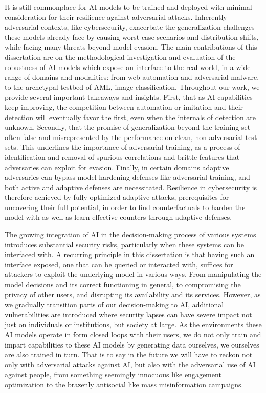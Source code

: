 It is still commonplace for \gls{AI} models to be trained and deployed with minimal consideration for their resilience against adversarial attacks.
Inherently adversarial contexts, like cybersecurity, exacerbate the generalization challenges these models already face by causing worst-case scenarios and distribution shifts, while facing many threats beyond model evasion.
The main contributions of this dissertation are on the methodological investigation and evaluation of the robustness of AI models which expose an interface to the real world, in a wide range of domains and modalities: from web automation and adversarial malware, to the archetypal testbed of \gls{AML}, image classification.
Throughout our work, we provide several important takeaways and insights.
First, that as \gls{AI} capabilities keep improving, the competition between automation or imitation and their detection will eventually favor the first, even when the internals of detection are unknown.
Secondly, that the promise of generalization beyond the training set often false and misrepresented by the performance on clean, non-adversarial test sets.
This underlines the importance of adversarial training, as a process of identification and removal of spurious correlations and brittle features that adversaries can exploit for evasion.
Finally, in certain domains adaptive adversaries can bypass model hardening defenses like adversarial training, and both active and adaptive defenses are necessitated.
Resilience in cybersecurity is therefore achieved by fully optimized adaptive attacks, prerequisites for uncovering their full potential, in order to find counterfactuals to harden the model with as well as learn effective counters through adaptive defenses.

The growing integration of \gls{AI} in the decision-making process of various systems introduces substantial security risks, particularly when these systems can be interfaced with.
A recurring principle in this dissertation is that having such an interface exposed, one that can be queried or interacted with, suffices for attackers to exploit the underlying model in various ways.
From manipulating the model decisions and its correct functioning in general, to compromising the privacy of other users, and disrupting its availability and its services.
However, as we gradually transition parts of our decision-making to AI, additional vulnerabilities are introduced where security lapses can have severe impact not just on individuals or institutions, but society at large. 
As the environments these AI models operate in form closed loops with their users, we do not only train and impart capabilities to these \gls{AI} models by generating data ourselves, we ourselves are also trained in turn.
That is to say in the future we will have to reckon not only with adversarial attacks against \gls{AI}, but also with the adversarial use of \gls{AI} against people, from something seemingly innocuous like engagement optimization to the brazenly antisocial like mass misinformation campaigns.


